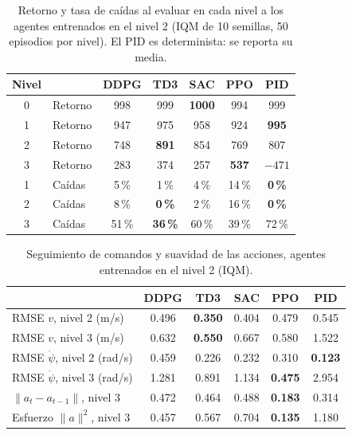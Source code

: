 \documentclass[11pt,a4paper]{article}
\newcommand{\best}[1]{\textbf{#1}}
\begin{document}
\begin{table}[H]
\centering
\caption{Retorno y tasa de caídas al evaluar en cada nivel a los agentes entrenados en el nivel 2 (IQM de 10 semillas, 50 episodios por nivel). El PID es determinista: se reporta su media.}
\label{tab:e3}
\small
\begin{tabular}{@{}clccccc@{}}
\toprule
Nivel & & DDPG & TD3 & SAC & PPO & PID \\
\midrule
0 & Retorno & 998 & 999 & \best{1000} & 994 & 999 \\
1 & Retorno & 947 & 975 & 958 & 924 & \best{995} \\
2 & Retorno & 748 & \best{891} & 854 & 769 & 807 \\
3 & Retorno & 283 & 374 & 257 & \best{537} & $-471$ \\
\midrule
1 & Caídas & 5\,\% & 1\,\% & 4\,\% & 14\,\% & \best{0\,\%} \\
2 & Caídas & 8\,\% & \best{0\,\%} & 2\,\% & 16\,\% & \best{0\,\%} \\
3 & Caídas & 51\,\% & \best{36\,\%} & 60\,\% & 39\,\% & 72\,\% \\
\bottomrule
\end{tabular}
\end{table}

\begin{table}[H]
\centering
\caption{Seguimiento de comandos y suavidad de las acciones, agentes entrenados en el nivel 2 (IQM).}
\label{tab:seguimiento}
\small
\begin{tabular}{@{}lccccc@{}}
\toprule
 & DDPG & TD3 & SAC & PPO & PID \\
\midrule
RMSE $v$, nivel 2 (m/s) & 0.496 & \best{0.350} & 0.404 & 0.479 & 0.545 \\
RMSE $v$, nivel 3 (m/s) & 0.632 & \best{0.550} & 0.667 & 0.580 & 1.522 \\
RMSE $\dot\psi$, nivel 2 (rad/s) & 0.459 & 0.226 & 0.232 & 0.310 & \best{0.123} \\
RMSE $\dot\psi$, nivel 3 (rad/s) & 1.281 & 0.891 & 1.134 & \best{0.475} & 2.954 \\
$\lVert a_t-a_{t-1}\rVert$, nivel 3 & 0.472 & 0.464 & 0.488 & \best{0.183} & 0.314 \\
Esfuerzo $\lVert a\rVert^2$, nivel 3 & 0.457 & 0.567 & 0.704 & \best{0.135} & 1.180 \\
\bottomrule
\end{tabular}
\end{table}
\end{document}
